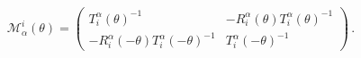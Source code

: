 \begin{equation}
\mathcal{M}_{\alpha }^{i}(\theta )=\left( 
\begin{array}{cc}
T_{i}^{\alpha }(\theta )^{-1} & -R_{i}^{\alpha }(\theta )T_{i}^{\alpha
}(\theta )^{-1} \\ 
-R_{i}^{\alpha }(-\theta )T_{i}^{\alpha }(-\theta )^{-1} & T_{i}^{\alpha
}(-\theta )^{-1}%
\end{array}
\right) \,.
\end{equation}

